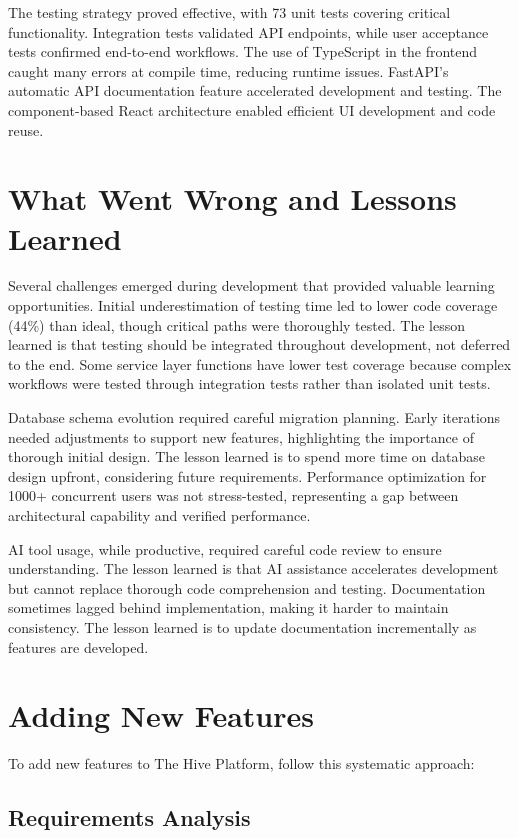\documentclass[12pt,a4paper]{report}
\begin{document}
The testing strategy proved effective, with 73 unit tests covering critical functionality. Integration tests validated API endpoints, while user acceptance tests confirmed end-to-end workflows. The use of TypeScript in the frontend caught many errors at compile time, reducing runtime issues. FastAPI's automatic API documentation feature accelerated development and testing. The component-based React architecture enabled efficient UI development and code reuse.

\section{What Went Wrong and Lessons Learned}

Several challenges emerged during development that provided valuable learning opportunities. Initial underestimation of testing time led to lower code coverage (44\%) than ideal, though critical paths were thoroughly tested. The lesson learned is that testing should be integrated throughout development, not deferred to the end. Some service layer functions have lower test coverage because complex workflows were tested through integration tests rather than isolated unit tests.

Database schema evolution required careful migration planning. Early iterations needed adjustments to support new features, highlighting the importance of thorough initial design. The lesson learned is to spend more time on database design upfront, considering future requirements. Performance optimization for 1000+ concurrent users was not stress-tested, representing a gap between architectural capability and verified performance.

AI tool usage, while productive, required careful code review to ensure understanding. The lesson learned is that AI assistance accelerates development but cannot replace thorough code comprehension and testing. Documentation sometimes lagged behind implementation, making it harder to maintain consistency. The lesson learned is to update documentation incrementally as features are developed.

\section{Adding New Features}

To add new features to The Hive Platform, follow this systematic approach:

\subsection{Requirements Analysis}
\end{document}
